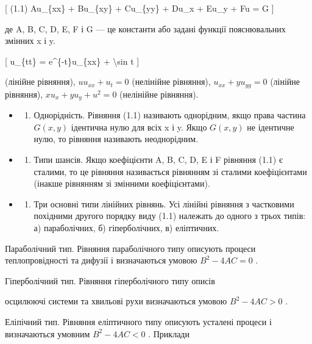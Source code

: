 \documentclass[
]{article}
\providecommand{\tightlist}{%
  \setlength{\itemsep}{0pt}\setlength{\parskip}{0pt}}
\begin{document}
{[} (1.1) Au\_\{xx\} + Bu\_\{xy\} + Cu\_\{yy\} + Du\_x + Eu\_y + Fu = G
{]}

де A, B, C, D, E, F і G --- це константи або задані функції
пояснювальних змінних x і y.

{[} u\_\{tt\} = e\^{}\{-t\}u\_\{xx\} + \textbackslash sin t {]}

(лінійне рівняння), \(uu_{xx} + u_t = 0\) (нелінійне рівняння),
\(u_{xx} + yu_{yy} = 0\) (лінійне рівняння), \(xu_x + yu_y + u^2 = 0\)
(нелінійне рівняння).

\begin{itemize}
\tightlist
\item
  \begin{enumerate}
  \def\labelenumi{\arabic{enumi}.}
  \setcounter{enumi}{3}
  \tightlist
  \item
    Однорідність. Рівняння (1.1) називають однорідним, якщо права
    частина \(G(x, y)\) ідентична нулю для всіх x і y. Якщо \(G(x, y)\)
    не ідентичне нулю, то рівняння називають неоднорідним.
  \end{enumerate}
\item
  \begin{enumerate}
  \def\labelenumi{\arabic{enumi}.}
  \setcounter{enumi}{4}
  \tightlist
  \item
    Типи шансів. Якщо коефіцієнти A, B, C, D, E і F рівняння (1.1) є
    сталими, то це рівняння називається рівнянням зі сталими
    коефіцієнтами (інакше рівнянням зі змінними коефіцієнтами).
  \end{enumerate}
\item
  \begin{enumerate}
  \def\labelenumi{\arabic{enumi}.}
  \setcounter{enumi}{5}
  \tightlist
  \item
    Три основні типи лінійних рівнянь. Усі лінійні рівняння з частковими
    похідними другого порядку виду (1.1) належать до одного з трьох
    типів: а) параболічних, б) гіперболічних, в) еліптичних.
  \end{enumerate}
\end{itemize}

Параболічний тип. Рівняння параболічного типу описують процеси
теплопровідності та дифузії і визначаються умовою \(B^2 - 4AC = 0\) .

Гіперболічний тип. Рівняння гіперболічного типу описів

осцилюючі системи та хвильові рухи визначаються умовою \(B^2-4AC>0\) .

Еліпічний тип. Рівняння еліптичного типу описують усталені процеси і
визначаються умовним \(B^2-4AC<0\) . Приклади
\end{document}
